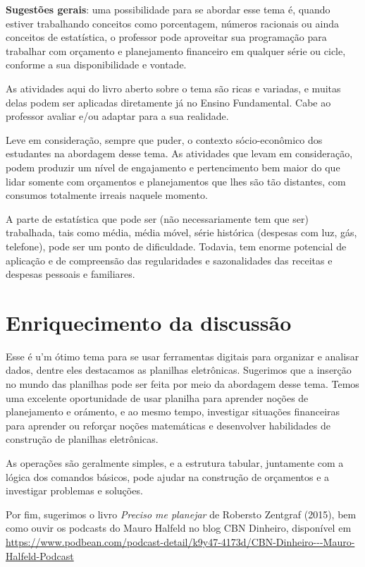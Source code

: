 \begin{paginatexto2}
\textbf{Sugestões gerais}: uma possibilidade para se abordar esse tema é, quando estiver trabalhando conceitos como porcentagem, números racionais ou ainda conceitos de estatística, o professor pode aproveitar sua programação para trabalhar com orçamento e planejamento financeiro em qualquer série ou cicle, conforme a sua disponibilidade e vontade.

As atividades aqui do livro aberto sobre o tema são ricas e variadas, e muitas delas podem ser aplicadas diretamente já no Ensino Fundamental. Cabe ao professor avaliar e/ou adaptar para a sua realidade.

Leve em consideração, sempre que puder, o contexto sócio-econômico dos estudantes na abordagem desse tema. As atividades que levam em consideração, podem produzir um nível de engajamento e pertencimento bem maior do que lidar somente com orçamentos e planejamentos que lhes são tão distantes, com consumos totalmente irreais naquele momento.

A parte de estatística que pode ser (não necessariamente tem que ser) trabalhada, tais como média, média móvel, série histórica (despesas com luz, gás, telefone), pode ser um ponto de dificuldade. Todavia, tem enorme potencial de aplicação e de compreensão das regularidades e sazonalidades das receitas e despesas pessoais e familiares.

\section*{Enriquecimento da discussão}

Esse é u'm ótimo tema para se usar ferramentas digitais para organizar e analisar dados, dentre eles destacamos as planilhas eletrônicas. Sugerimos que a inserção no mundo das planilhas pode ser feita por meio da abordagem desse tema. Temos uma excelente oportunidade de usar planilha para aprender noções de planejamento e orámento, e ao mesmo tempo, investigar situações financeiras para aprender ou reforçar noções matemáticas e desenvolver habilidades de construção de planilhas eletrônicas.

As operações são geralmente simples, e a estrutura tabular, juntamente com a lógica dos comandos básicos, pode ajudar na construção de orçamentos e a investigar problemas e soluções.

Por fim, sugerimos o livro \textit{Preciso me planejar} de Robersto Zentgraf (2015), bem como ouvir os podcasts do Mauro Halfeld no blog CBN Dinheiro, disponível em \url{https://www.podbean.com/podcast-detail/k9y47-4173d/CBN-Dinheiro---Mauro-Halfeld-Podcast}

\end{paginatexto2}


